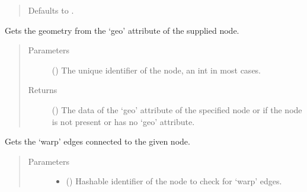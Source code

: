 \documentclass[letterpaper,10pt,english]{sphinxmanual}
\begin{document}
\begin{fulllineitems}
\begin{fulllineitems}
\begin{quote}
\begin{description}
\begin{itemize}
Defaults to .


\end{itemize}

\end{description}\end{quote}

\end{fulllineitems}


\begin{fulllineitems}
\label{\detokenize{cockatoo:cockatoo.KnitNetworkBase.node_geometry}}
Gets the geometry from the ‘geo’ attribute of the supplied node.
\begin{quote}\begin{description}
\item[{Parameters}] \leavevmode
{} () \textendash{} The unique identifier of the node, an int in most cases.

\item[{Returns}] \leavevmode
{} () \textendash{} The data of the ‘geo’ attribute of the specified node or 
if the node is not present or has no ‘geo’ attribute.

\end{description}\end{quote}

\end{fulllineitems}


\begin{fulllineitems}
\label{\detokenize{cockatoo:cockatoo.KnitNetworkBase.node_warp_edges}}
Gets the ‘warp’ edges connected to the given node.
\begin{quote}\begin{description}
\item[{Parameters}] \leavevmode\begin{itemize}
\item {} 
 () \textendash{} Hashable identifier of the node to check for ‘warp’ edges.


\end{itemize}
\end{description}
\end{quote}
\end{fulllineitems}
\end{fulllineitems}
\end{document}

